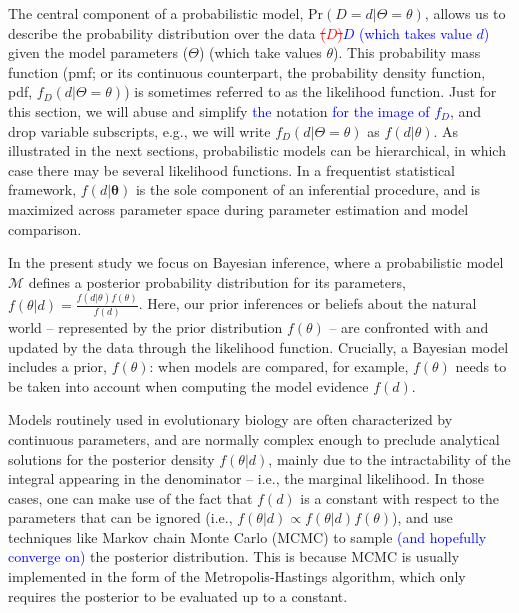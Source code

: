 \documentclass[oneside]{article}
\begin{document}
The central component of a probabilistic model, $\text{Pr}(D=d|\Theta=\theta)$, allows us to describe the probability distribution over the data \textcolor{red}{\st{($D$)}}\textcolor{blue}{$D$ (which takes value $d$)} given the model parameters ($\Theta$) (which take values $\theta$).
This probability mass function (pmf; or its continuous counterpart, the probability density function, pdf, $f_D(d|\Theta=\theta)$) is sometimes referred to as the likelihood function.
Just for this section, we will abuse and simplify \textcolor{blue}{the} notation \textcolor{blue}{for the image of $f_D$}, and drop variable subscripts, e.g., we will write $f_D(d|\Theta=\theta)$ as $f(d|\theta)$.
As illustrated in the next sections, probabilistic models can be hierarchical, in which case there may be several likelihood functions.
In a frequentist statistical framework, $f(d|\boldsymbol{\theta})$ is the sole component of an inferential procedure, and is maximized across parameter space during parameter estimation and model comparison.

In the present study we focus on Bayesian inference, where a probabilistic model $\mathcal{M}$ defines a posterior  probability distribution for its parameters, $f(\theta|d) = \frac{f(d|\theta)f(\theta)}{f(d)}$.
Here, our prior inferences or beliefs about the natural world -- represented by the prior distribution $f(\theta)$ -- are confronted with and updated by the data through the likelihood function.
Crucially, a Bayesian model includes a prior, $f(\theta)$: when models are compared, for example, $f(\theta)$ needs to be taken into account when computing the model evidence $f(d)$.

Models routinely used in evolutionary biology are often characterized by continuous parameters, and are normally complex enough to preclude analytical solutions for the posterior density $f(\theta|d)$, mainly due to the intractability of the integral appearing in the denominator -- i.e., the marginal likelihood.
In those cases, one can make use of the fact that $f(d)$ is a constant with respect to the parameters that can be ignored (i.e., $f(\theta|d) \propto f(\theta|d)f(\theta)$), and use techniques like Markov chain Monte Carlo (MCMC) to sample \textcolor{blue}{(and hopefully converge on)} the posterior distribution.
This is because MCMC is usually implemented in the form of the Metropolis-Hastings \citep{metropolis53,mh} algorithm, which only requires the posterior to be evaluated up to a constant.
\end{document}
